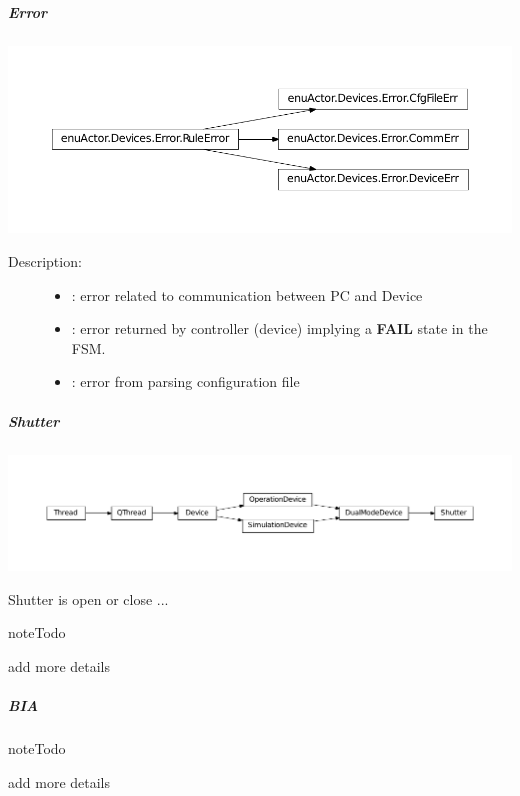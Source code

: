 \documentclass[letterpaper,10pt,english]{sphinxmanual}
\begin{document}
\subparagraph{Error}
\label{enuActor.Devices:error}
\includegraphics{inheritance-a934816c9f8b411a63067bc85b1ddf5dfcadc0b3.pdf}
\begin{description}
\item[{Description:}] \leavevmode\begin{itemize}
\item {} 
{\hyperref[enuActor.Devices:enuActor.Devices.Error.CommErr]{}}: error related to communication between PC and Device

\item {} 
{\hyperref[enuActor.Devices:enuActor.Devices.Error.DeviceErr]{}}: error returned by controller (device) implying a \textbf{FAIL} state in the FSM.

\item {} 
{\hyperref[enuActor.Devices:enuActor.Devices.Error.CfgFileErr]{}}: error from parsing configuration file

\end{itemize}

\end{description}


\subparagraph{Shutter}
\label{enuActor.Devices:shutter}
\includegraphics{inheritance-65bf464aaae00a963e94ceeaf74d18a44a5c8913.pdf}

Shutter is open or close ...

\begin{notice}{note}{Todo}

add more details
\end{notice}


\subparagraph{BIA}
\label{enuActor.Devices:bia}
\begin{notice}{note}{Todo}

add more details
\end{notice}
\end{document}
